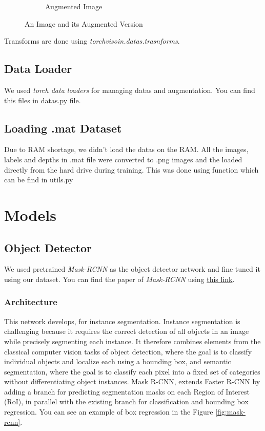 \documentclass[a4paper, openany]{book}
\begin{document}
\begin{figure}[ht]
\begin{subfigure}[b]{0.3\linewidth}
    \caption{Augmented Image}
  \end{subfigure}
  \caption{An Image and its Augmented Version}
  \label{fig:augment}
\end{figure}

Transforms are done using \textit{torchvisoin.datas.trasnforms}.
\subsection{Data Loader}
	\vspace{0.3cm}
We used \textit{torch data loaders} for managing datas and augmentation. You can find this files in datas.py file.

\subsection{Loading .mat Dataset}
	\vspace{0.3cm}

Due to RAM shortage, we didn't load the datas on the RAM. All the images, labels and depths in .mat file were converted to .png images and the loaded directly from the hard drive during training. This was done using function  which can be find in utils.py


\newpage

	
\section{Models}
	\vspace{0.3cm}
\subsection{Object Detector}
	\vspace{0.3cm}

We used pretrained \textit{Mask-RCNN} as the object detector network and fine tuned it using our dataset. You can find the paper of \textit{Mask-RCNN} using \href{https://arxiv.org/pdf/1703.06870.pdf}{this link}.

\subsubsection{Architecture}

This network develops, for instance segmentation. Instance segmentation is challenging because it requires the correct detection of all objects in an image while precisely segmenting each instance. It therefore combines elements from the classical computer vision tasks of object detection, where the goal is to classify individual objects and localize each using a bounding box, and semantic segmentation, where the goal is to classify each pixel into a fixed set of categories without differentiating object instances.
Mask R-CNN, extends Faster R-CNN by adding a branch for predicting segmentation masks on each Region of Interest (RoI), in parallel with the existing branch for classification and bounding box regression. You can see an example of box regression in the Figure \ref{fig:mask-rcnn}.
\end{document}
